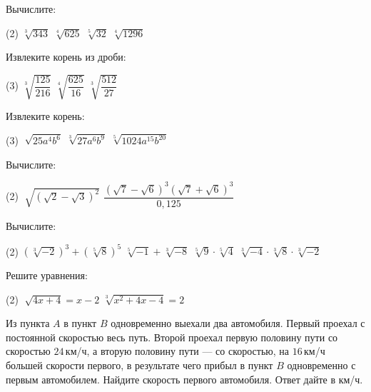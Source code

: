 \begin{homework}[number=1]
	\begin{listofex}
		\item Вычислите:
		\begin{tasks}(2)
			\task \( \sqrt[3]{343} \)
			\task \( \sqrt[4]{625} \)
			\task \( \sqrt[5]{32} \)
			\task \( \sqrt[4]{1296} \)
		\end{tasks}
		\item Извлеките корень из дроби:
		\begin{tasks}(3)
			\task \( \sqrt[3]{\dfrac{125}{216}} \)
			\task \( \sqrt[4]{\dfrac{625}{16}} \)
			\task \( \sqrt[3]{\dfrac{512}{27}} \)
		\end{tasks}
		\item Извлеките корень:
		\begin{tasks}(3)
			\task \( \sqrt[]{ 25a^4b^6 } \)
			\task \( \sqrt[3]{ 27a^6b^9 } \)
			\task \( \sqrt[5]{ 1024a^{15}b^{20} } \)
		\end{tasks}
		\item Вычислите:
		\begin{tasks}(2)
			\task \( \sqrt[]{(\sqrt{2}-\sqrt{3})^2} \)
			\task \( \dfrac{(\sqrt{7}-\sqrt{6})^3(\sqrt{7}+\sqrt{6})^3}{0,125} \)
		\end{tasks}
		\item Вычислите:
		\begin{tasks}(2)
			\task \( (\sqrt[3]{-2})^3 + (\sqrt[5]{8})^5 \)
			\task \( \sqrt[5]{-1} + \sqrt[3]{-8} \)
			\task \( \sqrt[5]{9} \cdot \sqrt[5]{4} \)
			\task \( \sqrt[3]{-4} \cdot \sqrt[3]{8} \cdot \sqrt[3]{-2} \)
		\end{tasks}
		\item Решите уравнения:
		\begin{tasks}(2)
			\task \( \sqrt[]{4x+4} = x-2 \)
			\task \( \sqrt[3]{x^2+4x-4}=2 \)
		\end{tasks}
		\item Из пункта \(A\) в пункт \(B\) одновременно выехали два автомобиля. Первый проехал с постоянной скоростью весь путь. Второй проехал первую половину пути со скоростью \(24\) км/ч, а вторую половину пути --- со скоростью, на \(16\) км/ч большей скорости первого, в результате чего прибыл в пункт \(B\) одновременно с первым автомобилем. Найдите скорость первого автомобиля. Ответ дайте в км/ч.
	\end{listofex}
\end{homework}

